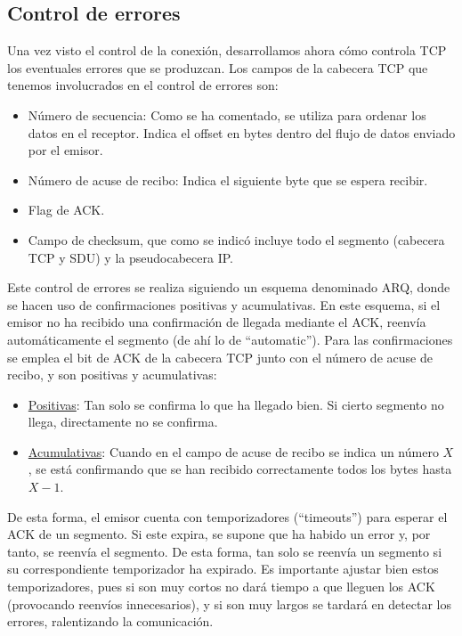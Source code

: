 \subsection{Control de errores}
Una vez visto el control de la conexión, desarrollamos ahora cómo controla \acrshort{TCP} los eventuales errores que se produzcan.
Los campos de la cabecera \acrshort{TCP} que tenemos involucrados en el control de errores son:
\begin{itemize}
    \item Número de secuencia: Como se ha comentado, se utiliza para ordenar los datos en el receptor. Indica el offset en bytes dentro del flujo de datos enviado por el emisor.
    \item Número de acuse de recibo: Indica el siguiente byte que se espera recibir.
    \item Flag de ACK.
    \item Campo de checksum, que como se indicó incluye todo el segmento (cabecera \acrshort{TCP} y \acrshort{SDU}) y la pseudocabecera \acrshort{IP}.
\end{itemize}

Este control de errores se realiza siguiendo un esquema denominado \acrfull{ARQ}, donde se hacen uso de confirmaciones positivas y acumulativas. En este esquema, si el emisor no ha recibido una confirmación de llegada mediante el \acrshort{ACK}, reenvía automáticamente el segmento (de ahí lo de ``automatic''). Para las confirmaciones se emplea el bit de \acrshort{ACK} de la cabecera \acrshort{TCP} junto con el número de acuse de recibo, y son positivas y acumulativas:
\begin{itemize}
    \item \ul{Positivas}: Tan solo se confirma lo que ha llegado bien. Si cierto segmento no llega, directamente no se confirma.
    
    \item \ul{Acumulativas}: Cuando en el campo de acuse de recibo se indica un número $X$, se está confirmando que se han recibido correctamente todos los bytes hasta $X-1$.
\end{itemize}

De esta forma, el emisor cuenta con temporizadores (``timeouts'') para esperar el \acrshort{ACK} de un segmento. Si este expira, se supone que ha habido un error y, por tanto, se reenvía el segmento. De esta forma, tan solo se reenvía un segmento si su correspondiente temporizador ha expirado. Es importante ajustar bien estos temporizadores, pues si son muy cortos no dará tiempo a que lleguen los \acrshort{ACK} (provocando reenvíos innecesarios), y si son muy largos se tardará en detectar los errores, ralentizando la comunicación.\\

